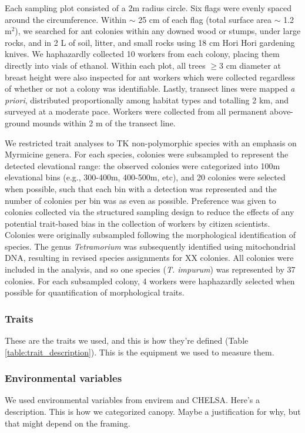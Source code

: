\documentclass[review,preprint,3p]{elsarticle}
\begin{document}
	Each sampling plot consisted of a 2m radius circle. Six flags were evenly spaced around the circumference. Within $\sim$ 25 cm of each flag (total surface area $\sim$ 1.2 m$^2$), we searched for ant colonies within any downed wood or stumps, under large rocks, and in 2 L of soil, litter, and small rocks using 18 cm Hori Hori gardening knives. We haphazardly collected 10 workers from each colony, placing them directly into vials of ethanol. Within each plot, all trees $\geq$3 cm diameter at breast height were also inspected for ant workers which were collected regardless of whether or not a colony was identifiable. Lastly, transect lines were mapped \textit{a priori}, distributed proportionally among habitat types and totalling 2 km, and surveyed at a moderate pace. Workers were collected from all permanent above-ground mounds within 2 m of the transect line. 
	
	We restricted trait analyses to TK non-polymorphic species with an emphasis on Myrmicine genera. For each species, colonies were subsampled to represent the detected elevational range: the observed colonies were categorized into 100m elevational bins (e.g., 300-400m, 400-500m, etc), and 20 colonies were selected when possible, such that each bin with a detection was represented and the number of colonies per bin was as even as possible. Preference was given to colonies collected via the structured sampling design to reduce the effects of any potential trait-based bias in the collection of workers by citizen scientists. Colonies were originally subsampled following the morphological identification of species. The genus \textit{Tetramorium} was subsequently identified using mitochondrial DNA, resulting in revised species assignments for XX colonies. All colonies were included in the analysis, and so one species (\textit{T. impurum}) was represented by 37 colonies. For each subsampled colony, 4 workers were haphazardly selected when possible for quantification of morphological traits.
	
	
	\subsubsection{Traits}
	These are the traits we used, and this is how they're defined (Table \ref{table:trait_description}). This is the equipment we used to measure them. 
	
	\subsubsection{Environmental variables}
	We used environmental variables from envirem and CHELSA. Here's a description. This is how we categorized canopy. Maybe a justification for why, but that might depend on the framing.
	
\end{document}
